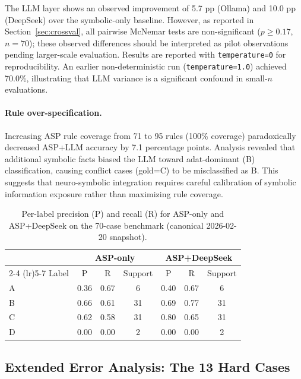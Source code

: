 \documentclass[11pt]{article}
\begin{document}
The LLM layer shows an observed improvement of 5.7 pp (Ollama) and 10.0 pp (DeepSeek) over the symbolic-only baseline. However, as reported in Section~\ref{sec:crossval}, all pairwise McNemar tests are non-significant ($p \geq 0.17$, $n=70$); these observed differences should be interpreted as pilot observations pending larger-scale evaluation. Results are reported with \texttt{temperature=0} for reproducibility. An earlier non-deterministic run (\texttt{temperature=1.0}) achieved 70.0\%, illustrating that LLM variance is a significant confound in small-$n$ evaluations.

\paragraph{Rule over-specification.}\label{sec:overspec}
Increasing ASP rule coverage from 71 to 95 rules (100\% coverage) paradoxically decreased ASP+LLM accuracy by 7.1 percentage points. Analysis revealed that additional symbolic facts biased the LLM toward adat-dominant (B) classification, causing conflict cases (gold=C) to be misclassified as B. This suggests that neuro-symbolic integration requires careful calibration of symbolic information exposure rather than maximizing rule coverage.

\begin{table}[h]
\centering
\begin{tabular}{lcccccc}
\toprule
 & \multicolumn{3}{c}{ASP-only} & \multicolumn{3}{c}{ASP+DeepSeek} \\
\cmidrule(lr){2-4} \cmidrule(lr){5-7}
Label & P & R & Support & P & R & Support \\
\midrule
A & 0.36 & 0.67 & 6 & 0.40 & 0.67 & 6 \\
B & 0.66 & 0.61 & 31 & 0.69 & 0.77 & 31 \\
C & 0.62 & 0.58 & 31 & 0.80 & 0.65 & 31 \\
D & 0.00 & 0.00 & 2 & 0.00 & 0.00 & 2 \\
\bottomrule
\end{tabular}
\caption{Per-label precision (P) and recall (R) for ASP-only and ASP+DeepSeek on the 70-case benchmark (canonical 2026-02-20 snapshot).}
\label{tab:labelperf}
\end{table}

\subsection{Extended Error Analysis: The 13 Hard Cases}
\end{document}
